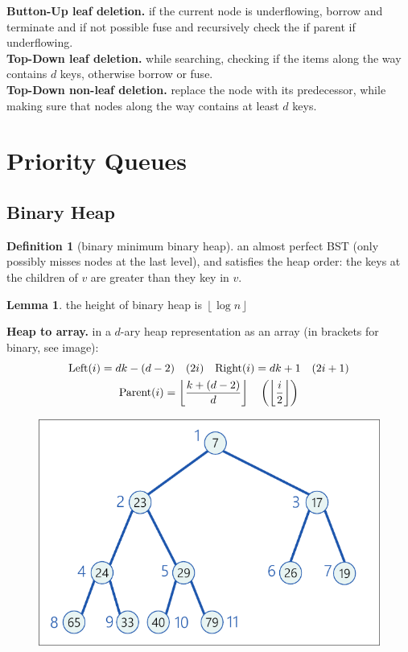\documentclass[]{article}
\newcommand\compactsubsection[1]        {\vspace{-10pt}\subsection{#1}\vspace{-5pt}}
\newcommand\compactsection   [1]        {\vspace{-10pt}\section{#1}\vspace{-5pt}}
\newcommand\subsectionrightaftersection {\vspace{10pt}}
\theoremstyle{definition}
\newtheorem{Definition}{\color{defiColor}Definition}
\newtheorem{Lemma}{\color{lemColor}Lemma}
\newcommand\lem   [1] {\begin{Lemma}#1\end{Lemma}}
\newcommand\rf    {\right\rfloor}
\newcommand\lf    {\left\lfloor}
\newcommand\floor [1] {\lf #1 \rf}
\newcommand\logn      {\log n}
\newcommand\cl [1]    {\left ( #1 \right )}
\begin{document}
\begin{multicols}{4}
					\textbf{Button-Up leaf deletion. }if the current node is underflowing, borrow and terminate and if not possible fuse and recursively check the if parent if underflowing. \\
					\textbf{Top-Down leaf deletion. }while searching, checking if the items along the way contains $d$ keys, otherwise borrow or fuse. \\
					\textbf{Top-Down non-leaf deletion. }replace the node with its predecessor, while making sure that nodes along the way contains at least $d$ keys. 
		
		\vspace{-2pt}
		\compactsection{Priority Queues}\subsectionrightaftersection
			\compactsubsection{Binary Heap}
				\begin{Definition}[binary minimum binary heap]
					an almost perfect BST (only possibly misses nodes at the last level), and satisfies the heap order: the keys at the children of $v$ are greater than they key in $v$. 
				\end{Definition}
				\lem{the height of binary heap is $\floor{\logn}$}				
				\textbf{Heap to array. }in a $d$-ary heap representation as an array (in brackets for binary, see image): 
				\vspace{-7pt}\begin{gather*}
					\textstyle \text{\rm Left}(i) = dk - (d-2) \quad (2i) \quad \text{\rm Right}(i) = dk + 1 \quad (2i + 1) \\ 
					\text{\rm Parent}(i) = \floor{\frac{k + (d - 2)}{d}} \quad\cl{\floor{\frac{i}{2}}}
				\end{gather*}\vspace{-7pt}
				\begin{figure}
					\includegraphics[width=\linewidth]{images/binaryHeapIntoArray}

\end{figure}
\end{multicols}
\end{document}
